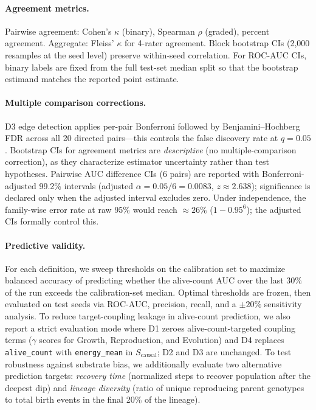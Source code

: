 \documentclass[letterpaper]{article}
\begin{document}
\paragraph{Agreement metrics.}
Pairwise agreement: Cohen's $\kappa$ (binary), Spearman $\rho$ (graded),
percent agreement.  Aggregate: Fleiss' $\kappa$ for 4-rater agreement.
Block bootstrap CIs (2,000 resamples at the seed level) preserve
within-seed correlation.  For ROC-AUC CIs, binary labels are fixed
from the full test-set median split so that the bootstrap estimand
matches the reported point estimate.

\paragraph{Multiple comparison corrections.}
D3 edge detection applies per-pair Bonferroni followed by
Benjamini--Hochberg FDR across all 20 directed pairs---this controls the
false discovery rate at $q = 0.05$.  Bootstrap CIs for agreement metrics
are \emph{descriptive} (no multiple-comparison correction), as they
characterize estimator uncertainty rather than test hypotheses.  Pairwise
AUC difference CIs (6 pairs) are reported with Bonferroni-adjusted
99.2\% intervals (adjusted $\alpha = 0.05/6 = 0.0083$, $z \approx 2.638$);
significance is declared only when the adjusted interval excludes zero.
Under independence, the family-wise error rate at raw 95\% would reach
${\approx}26\%$ ($1 - 0.95^6$); the adjusted CIs formally control this.

\paragraph{Predictive validity.}
For each definition, we sweep thresholds on the calibration set to
maximize balanced accuracy of predicting whether the alive-count AUC
over the last 30\% of the run exceeds the calibration-set median.
Optimal thresholds are frozen, then evaluated on test seeds via
ROC-AUC, precision, recall, and a $\pm 20\%$ sensitivity analysis.
To reduce target-coupling leakage in alive-count prediction, we also report
a strict evaluation mode where D1 zeroes alive-count-targeted coupling
terms ($\gamma$ scores for Growth, Reproduction, and Evolution) and D4
replaces \texttt{alive\_count} with \texttt{energy\_mean} in
$S_\text{causal}$; D2 and D3 are unchanged.
To test robustness against substrate bias, we additionally evaluate
two alternative prediction targets: \emph{recovery time} (normalized
steps to recover population after the deepest dip) and
\emph{lineage diversity} (ratio of unique reproducing parent genotypes
to total birth events in the final 20\% of the lineage).
\end{document}
